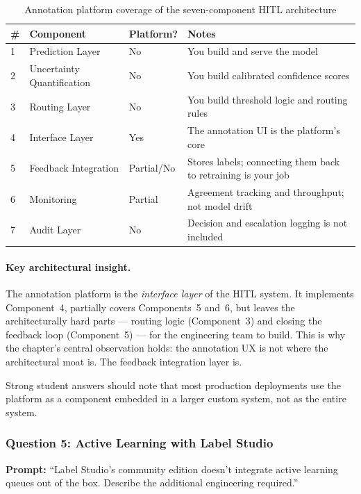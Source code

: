 \begin{table}[htbp]
\caption{Annotation platform coverage of the seven-component HITL architecture}
\label{tab:platform-architecture}
\centering
\begin{tabular}{@{}p{0.5cm}p{3cm}p{3cm}p{4cm}@{}}
\toprule
\textbf{\#} & \textbf{Component} & \textbf{Platform?} & \textbf{Notes} \\
\midrule
1 & Prediction Layer & No & You build and serve the model \\
2 & Uncertainty Quantification & No & You build calibrated confidence scores \\
3 & Routing Layer & No & You build threshold logic and routing rules \\
4 & Interface Layer & Yes & The annotation UI is the platform's core \\
5 & Feedback Integration & Partial/No & Stores labels; connecting them back to retraining is your job \\
6 & Monitoring & Partial & Agreement tracking and throughput; not model drift \\
7 & Audit Layer & No & Decision and escalation logging is not included \\
\bottomrule
\end{tabular}
\end{table}

\paragraph{Key architectural insight.}

The annotation platform is the \emph{interface layer} of the HITL system. It implements Component~4, partially covers Components~5 and~6, but leaves the architecturally hard parts --- routing logic (Component~3) and closing the feedback loop (Component~5) --- for the engineering team to build. This is why the chapter's central observation holds: the annotation UX is not where the architectural moat is. The feedback integration layer is.

Strong student answers should note that most production deployments use the platform as a component embedded in a larger custom system, not as the entire system.

\subsubsection{Question 5: Active Learning with Label Studio}

\textbf{Prompt:} ``Label Studio's community edition doesn't integrate active learning queues out of the box. Describe the additional engineering required.''

